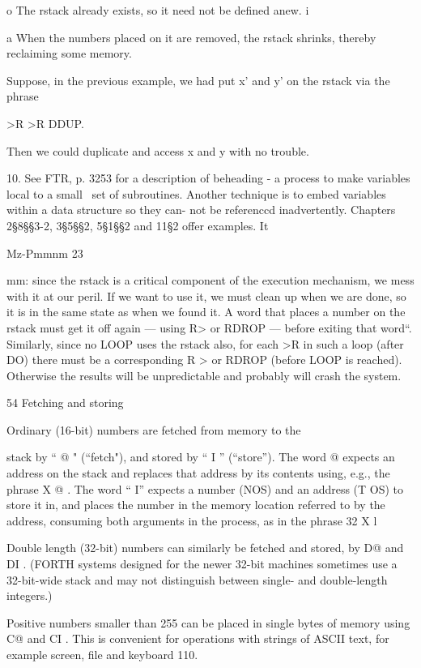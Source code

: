 o The rstack already exists, so it need not be deﬁned anew. i

a When the numbers placed on it are removed, the rstack
shrinks, thereby reclaiming some memory.

Suppose, in the previous example, we had put x’ and y’ on the
rstack via the phrase

>R >R DDUP.

Then we could duplicate and access x and y with no trouble.

 

10. See FTR, p. 3253 for a description of beheading - a process to make variables local to a small \
set of subroutines. Another technique is to embed variables within a data structure so they can-
not be referenccd inadvertently. Chapters 2§8§§3-2, 3§5§§2, 5§1§§2 and 11§2 offer examples. It

 

Mz-Pmmnm 23

mm: since the rstack is a critical component of the
execution mechanism, we mess with it at our peril. If we want to
use it, we must clean up when we are done, so it is in the same
state as when we found it. A word that places a number on the
rstack must get it off again — using R> or RDROP — before
exiting that word“. Similarly, since no LOOP uses the rstack
also, for each >R in such a loop (after DO) there must be a
corresponding R > or RDROP (before LOOP is reached).
Otherwise the results will be unpredictable and probably will crash
the system.

54 Fetching and storing

Ordinary (16-bit) numbers are fetched from memory to the

stack by “ @ " (“fetch"), and stored by “ I ” (“store”). The
word @ expects an address on the stack and replaces that address
by its contents using, e.g., the phrase X @ . The word “ I”
expects a number (NOS) and an address (T OS) to store it in, and
places the number in the memory location referred to by the
address, consuming both arguments in the process, as in the
phrase 32 X l

Double length (32-bit) numbers can similarly be fetched and
stored, by D@ and DI . (FORTH systems designed for the newer
32-bit machines sometimes use a 32-bit-wide stack and may not
distinguish between single- and double-length integers.)

Positive numbers smaller than 255 can be placed in single bytes
of memory using C@ and CI . This is convenient for operations
with strings of ASCII text, for example screen, ﬁle and keyboard
110.

